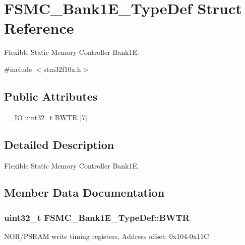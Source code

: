 \hypertarget{struct_f_s_m_c___bank1_e___type_def}{\section{F\-S\-M\-C\-\_\-\-Bank1\-E\-\_\-\-Type\-Def Struct Reference}
\label{struct_f_s_m_c___bank1_e___type_def}
}


Flexible Static Memory Controller Bank1\-E.  




{\ttfamily \#include $<$stm32f10x.\-h$>$}

\subsection*{Public Attributes}
\begin{DoxyCompactItemize}
\item 
\hyperlink{group___c_m_s_i_s__core__definitions_gaec43007d9998a0a0e01faede4133d6be}{\-\_\-\-\_\-\-I\-O} uint32\-\_\-t \hyperlink{struct_f_s_m_c___bank1_e___type_def_af48b21e4fa1f975f235bbb3a66a3d38e}{B\-W\-T\-R} \mbox{[}7\mbox{]}
\end{DoxyCompactItemize}


\subsection{Detailed Description}
Flexible Static Memory Controller Bank1\-E. 

\subsection{Member Data Documentation}
\hypertarget{struct_f_s_m_c___bank1_e___type_def_af48b21e4fa1f975f235bbb3a66a3d38e}{
\subsubsection[{B\-W\-T\-R}]{ uint32\-\_\-t F\-S\-M\-C\-\_\-\-Bank1\-E\-\_\-\-Type\-Def\-::\-B\-W\-T\-R}}\label{struct_f_s_m_c___bank1_e___type_def_af48b21e4fa1f975f235bbb3a66a3d38e}
N\-O\-R/\-P\-S\-R\-A\-M write timing registers, Address offset\-: 0x104-\/0x11\-C 

